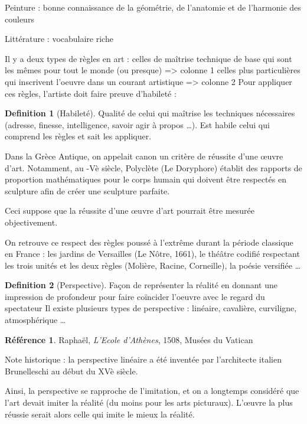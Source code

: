 \documentclass[french]{book}
\theoremstyle{definition}
\newtheorem*{dfn}{Definition}
\newtheorem*{refe}{Référence}
\begin{document}
Peinture : bonne connaissance de la géométrie, de l’anatomie et de l’harmonie des couleurs


Littérature : vocabulaire riche




Il y a deux types de règles en art :
celles de maîtrise technique de base qui sont les mêmes pour tout le monde (ou presque) => colonne 1
celles plus particulières qui inscrivent l’oeuvre dans un courant artistique => colonne 2
Pour appliquer ces règles, l’artiste doit faire preuve d’habileté :

\begin{dfn}[Habileté]
Qualité de celui qui maîtrise les techniques nécessaires (adresse, finesse, intelligence, savoir agir à propos …). Est habile celui qui comprend les règles et sait les appliquer.
\end{dfn}

Dans la Grèce Antique, on appelait canon un critère de réussite d’une œuvre d’art. Notamment, au -Vè siècle, Polyclète (Le Doryphore) établit des rapports de proportion mathématiques pour le corps humain qui doivent être respectés en sculpture afin de créer une sculpture parfaite.

Ceci suppose que la réussite d’une œuvre d’art pourrait être mesurée objectivement.

On retrouve ce respect des règles poussé à l’extrême durant la période classique en France : les jardins de Versailles (Le Nôtre, 1661), le théâtre codifié respectant les trois unités et les deux règles (Molière, Racine, Corneille), la poésie versifiée … 

\begin{dfn}[Perspective]
Façon de représenter la réalité en donnant une impression de profondeur pour faire coïncider l’oeuvre avec le regard du spectateur
Il existe plusieurs types de perspective : linéaire, cavalière, curviligne, atmosphérique …
\end{dfn}


\begin{refe}
	Raphaël, \textit{L’Ecole d’Athènes}, 1508, Musées du Vatican
\end{refe}

Note historique : la perspective linéaire a été inventée par l’architecte italien Brunelleschi au début du XVè siècle.

Ainsi, la perspective se rapproche de l’imitation, et on a longtemps considéré que l’art devait imiter la réalité (du moins pour les arts picturaux). L'œuvre la plus réussie serait alors celle qui imite le mieux la réalité.
\end{document}
